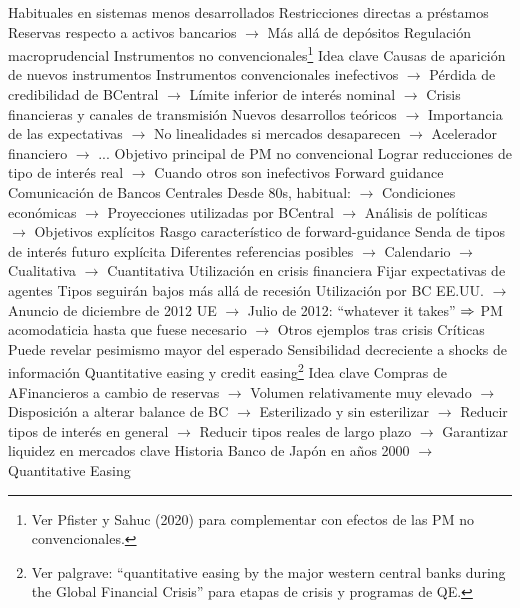 \documentclass{nuevotema}
\begin{document}
\begin{esquemal}
				\4 Habituales en sistemas menos desarrollados
				\4[] Restricciones directas a préstamos
				\4[] Reservas respecto a activos bancarios
				\4[] $\to$ Más allá de depósitos
				\4 Regulación macroprudencial
		\2 Instrumentos no convencionales\footnote{Ver Pfister y Sahuc (2020) para complementar con efectos de las PM no convencionales.}
			\3 Idea clave
				\4 Causas de aparición de nuevos instrumentos
				\4[] Instrumentos convencionales inefectivos
				\4[] $\to$ Pérdida de credibilidad de BCentral
				\4[] $\to$ Límite inferior de interés nominal
				\4[] $\to$ Crisis financieras y canales de transmisión
				\4[] Nuevos desarrollos teóricos
				\4[] $\to$ Importancia de las expectativas
				\4[] $\to$ No linealidades si mercados desaparecen
				\4[] $\to$ Acelerador financiero
				\4[] $\to$ ...
				\4 Objetivo principal de PM no convencional
				\4[] Lograr reducciones de tipo de interés real
				\4[] $\to$ Cuando otros son inefectivos
			\3 Forward guidance
				\4 Comunicación de Bancos Centrales
				\4[] Desde 80s, habitual:
				\4[] $\to$ Condiciones económicas
				\4[] $\to$ Proyecciones utilizadas por BCentral
				\4[] $\to$ Análisis de políticas
				\4[] $\to$ Objetivos explícitos
				\4 Rasgo característico de forward-guidance
				\4[] Senda de tipos de interés futuro explícita
				\4[] Diferentes referencias posibles
				\4[] $\to$ Calendario
				\4[] $\to$ Cualitativa
				\4[] $\to$ Cuantitativa
				\4 Utilización en crisis financiera
				\4[] Fijar expectativas de agentes
				\4[] Tipos seguirán bajos más allá de recesión
				\4 Utilización por BC
				\4[] EE.UU.
				\4[] $\to$ Anuncio de diciembre de 2012
				\4[] UE
				\4[] $\to$ Julio de 2012: ``whatever it takes''
				\4[] $\Rightarrow$ PM acomodaticia hasta que fuese necesario
				\4[] $\to$ Otros ejemplos tras crisis
				\4 Críticas
				\4[] Puede revelar pesimismo mayor del esperado
				\4[] Sensibilidad decreciente a shocks de información
			\3 Quantitative easing y credit easing\footnote{Ver palgrave: ``quantitative easing by the major western central banks during the Global Financial Crisis'' para etapas de crisis y programas de QE.}
				\4 Idea clave
				\4[] Compras de AFinancieros a cambio de reservas
				\4[] $\to$ Volumen relativamente muy elevado
				\4[] $\to$ Disposición a alterar balance de BC
				\4[] $\to$ Esterilizado y sin esterilizar
				\4[] $\to$ Reducir tipos de interés en general
				\4[] $\to$ Reducir tipos reales de largo plazo
				\4[] $\to$ Garantizar liquidez en mercados clave
				\4 Historia
				\4[] Banco de Japón en años 2000
				\4[] $\to$ Quantitative Easing

\end{esquemal}
\end{document}
